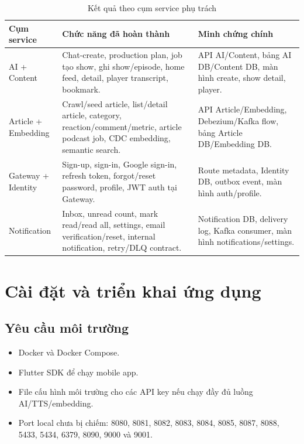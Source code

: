 \documentclass[14pt,a4paper,oneside]{extreport}
\begin{document}
\begin{table}[H]
\centering
\caption{Kết quả theo cụm service phụ trách}
\label{tab:ket-qua-ca-nhan}
\renewcommand{\arraystretch}{1.3}
\scriptsize
\begin{tabularx}{\textwidth}{|l|X|X|}
\hline
\textbf{Cụm service} & \textbf{Chức năng đã hoàn thành} & \textbf{Minh chứng chính} \\
\hline
AI + Content & Chat-create, production plan, job tạo show, ghi show/episode, home feed, detail, player transcript, bookmark. & API AI/Content, bảng AI DB/Content DB, màn hình create, show detail, player. \\
\hline
Article + Embedding & Crawl/seed article, list/detail article, category, reaction/comment/metric, article podcast job, CDC embedding, semantic search. & API Article/Embedding, Debezium/Kafka flow, bảng Article DB/Embedding DB. \\
\hline
Gateway + Identity & Sign-up, sign-in, Google sign-in, refresh token, forgot/reset password, profile, JWT auth tại Gateway. & Route metadata, Identity DB, outbox event, màn hình auth/profile. \\
\hline
Notification & Inbox, unread count, mark read/read all, settings, email verification/reset, internal notification, retry/DLQ contract. & Notification DB, delivery log, Kafka consumer, màn hình notifications/settings. \\
\hline
\end{tabularx}
\end{table}

\section{Cài đặt và triển khai ứng dụng}
\label{sec:cai-dat-trien-khai}

\subsection{Yêu cầu môi trường}

\begin{itemize}[leftmargin=2cm]
  \item Docker và Docker Compose.
  \item Flutter SDK để chạy mobile app.
  \item File cấu hình môi trường cho các API key nếu chạy đầy đủ luồng AI/TTS/embedding.
  \item Port local chưa bị chiếm: 8080, 8081, 8082, 8083, 8084, 8085, 8087, 8088, 5433, 5434, 6379, 8090, 9000 và 9001.
\end{itemize}
\end{document}
